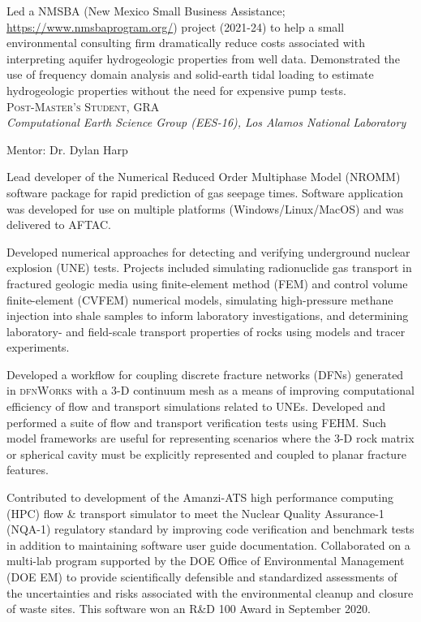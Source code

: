 \documentclass[11pt, letterpaper]{article}
\newcommand{\years}[1]{\marginnote{\scriptsize #1}}
\begin{document}
	Led a NMSBA (New Mexico Small Business Assistance;
	\href{https://www.nmsbaprogram.org/}{https://www.nmsbaprogram.org/})
	project (2021-24) to help a small environmental consulting firm dramatically reduce
	costs associated with interpreting aquifer hydrogeologic properties from
	well data.  Demonstrated the use of frequency domain analysis and
	solid-earth tidal loading to estimate hydrogeologic properties without the
	need for expensive pump tests. \\

\noindent
\years{2017 - 2019}\textsc{Post-Master's Student, GRA}\\
\textit{Computational Earth Science Group (EES-16), Los Alamos National Laboratory}

    \vspace{3pt} \noindent  
    Mentor: Dr. Dylan Harp

	Lead developer of the Numerical Reduced Order Multiphase Model (NROMM)
	software package for rapid prediction of gas seepage times. Software
	application was developed for use on multiple platforms
	(Windows/Linux/MacOS) and was delivered to AFTAC.

	Developed numerical approaches for detecting and verifying underground
	nuclear explosion (UNE) tests. Projects included simulating
	radionuclide gas transport in fractured geologic media using finite-element
	method (FEM) and control volume finite-element (CVFEM) numerical models,
	simulating high-pressure methane injection into shale samples to inform
	laboratory investigations, and determining laboratory- and field-scale
	transport properties of rocks using models and tracer experiments.

    Developed a workflow for coupling discrete fracture networks (DFNs)
    generated in \textsc{dfnWorks} with a 3-D continuum mesh as a means of
    improving computational efficiency of flow and transport simulations
    related to UNEs.  Developed and performed a suite of flow and transport
    verification tests using FEHM. Such model frameworks are useful for
    representing scenarios where the 3-D rock matrix or spherical cavity must
    be explicitly represented and coupled to planar fracture features.

    Contributed to development of the Amanzi-ATS high performance computing
    (HPC) flow \& transport simulator to meet the Nuclear Quality Assurance-1
    (NQA-1) regulatory standard by improving code verification and benchmark
    tests in addition to maintaining software user guide documentation.
    Collaborated on a multi-lab program supported by the DOE Office of
    Environmental Management (DOE EM) to provide scientifically defensible and
    standardized assessments of the uncertainties and risks associated with the
    environmental cleanup and closure of waste sites. This software won an R\&D
    100 Award in September 2020.\\%
\end{document}
